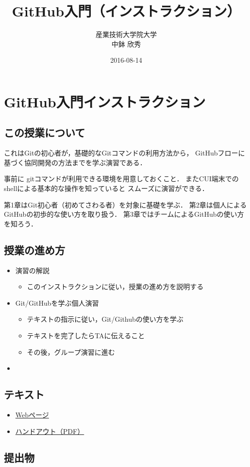 \documentclass[a4paper,twoside,twocolumn]{bxjsarticle}
\author{産業技術大学院大学\\ 中鉢 欣秀}
\date{2016-08-14}
\title{GitHub入門（インストラクション）}
\begin{document}
\maketitle

\section{GitHub入門インストラクション}
\label{sec-1}
\subsection{この授業について}
\label{sec-1-1}
これはGitの初心者が，基礎的なGitコマンドの利用方法から，
GitHubフローに基づく協同開発の方法までを学ぶ演習である．

事前に gitコマンドが利用できる環境を用意しておくこと．
またCUI端末でのshellによる基本的な操作を知っていると
スムーズに演習ができる．

第1章はGit初心者（初めてさわる者）を対象に基礎を学ぶ．
第2章は個人によるGitHubの初歩的な使い方を取り扱う．
第3章ではチームによるGitHubの使い方を知ろう．

\subsection{授業の進め方}
\label{sec-1-2}
\begin{itemize}
\item 演習の解説
\begin{itemize}
\item このインストラクションに従い，授業の進め方を説明する
\end{itemize}
\item Git/GitHubを学ぶ個人演習
\begin{itemize}
\item テキストの指示に従い，Git/Githubの使い方を学ぶ
\item テキストを完了したらTAに伝えること
\item その後，グループ演習に進む
\end{itemize}
\item 
\end{itemize}

\subsection{テキスト}
\label{sec-1-3}
\begin{itemize}
\item \href{./github_practice-handout.org}{Webページ}
\item \href{./github_practice-handout.pdf}{ハンドアウト（PDF）}
\end{itemize}

\subsection{提出物}
\label{sec-1-4}
\end{document}
